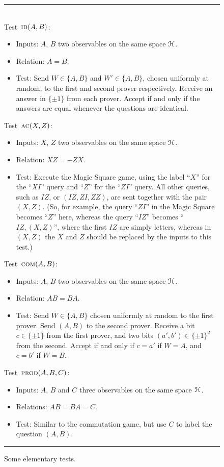 \begin{figure}[H]
\rule[1ex]{\textwidth}{0.5pt}\\
\justifying
Test~$\textsc{id}(A,B)$:
\begin{itemize}
    \item Inputs: $A$, $B$ two observables on the same space $\mathcal{H}$.
    \item Relation: $A=B$.
    \item Test: Send $W \in \{A,B\}$ and $W'\in\{A,B\}$, chosen uniformly at random, to the first and second prover respectively. Receive an answer in $\{\pm 1\}$ from each prover. Accept if and only if the answers are equal whenever the questions are identical. 
\end{itemize}

Test~$\textsc{ac}(X,Z)$:
\begin{itemize}
    \item Inputs: $X$, $Z$ two observables on the same space $\mathcal{H}$.
    \item Relation: $XZ=-ZX$.
    \item Test: Execute the Magic Square game, using the label ``$X$'' for the ``$XI$'' query and ``$Z$'' for the ``$ZI$'' query. All other queries, such as $IZ$, or $(IZ,ZI,ZZ)$, are sent together with the pair $(X,Z)$. (So, for example, the query ``$ZI$'' in the Magic Square becomes ``$Z$'' here, whereas the query ``$IZ$'' becomes ``$IZ,(X,Z)$'', where the first $IZ$ are simply letters, whereas in $(X,Z)$ the $X$ and $Z$ should be replaced by the inputs to this test.)
\end{itemize}

Test~$\textsc{com}(A,B)$:
\begin{itemize}
    \item Inputs: $A$, $B$ two observables on the same space $\mathcal{H}$.
    \item Relation: $AB=BA$.
    \item Test: Send $W\in\{A,B\}$ chosen uniformly at random to the first prover. Send $(A,B)$ to the second prover. Receive a bit $c\in\{\pm 1\}$ from the first prover, and two bits $(a',b')\in\{\pm 1\}^2$ from the second. Accept if and only if $c=a'$ if $W=A$, and $c=b'$ if $W=B$. 
\end{itemize}

Test~$\textsc{prod}(A,B,C)$:
\begin{itemize}
    \item Inputs: $A$, $B$ and $C$ three observables on the same space $\mathcal{H}$.
    \item Relations: $AB=BA=C$.
    \item Test: Similar to the commutation game, but use $C$ to label the question $(A,B)$.
\end{itemize}
\rule[2ex]{\textwidth}{0.5pt}\vspace{-.5cm}
\caption{Some elementary tests.}
\label{fig:elementary}
\end{figure}

